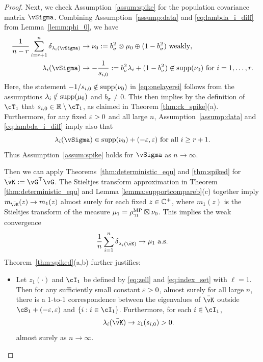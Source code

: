\begin{proof}
Next, we check Assumption~\ref{assum:spike} for the population
covariance matrix $\vSigma$.
Combining Assumption~\ref{assump:data} and \eqref{eq:lambda_i_diff} from
Lemma~\ref{lemm:phi_0}, we have
\begin{align}
\frac{1}{n-r}\sum_{i=r+1}^n \delta_{\lambda_i(\vSigma)}
&\to \nu_0:=b_\sigma^2 \otimes \mu_0 \oplus (1-b_\sigma^2) \text{ weakly},
\label{eq:onelayernu}\\
\lambda_i(\vSigma) &\to -\frac{1}{s_{i,0}}:=b_\sigma^2\lambda_i+(1-b_\sigma^2)
\not\in\supp{\nu_0} \text{ for } i=1,\ldots,r.
\label{eq:onelayersi}
\end{align}
Here, the statement $-1/s_{i,0} \notin \mathrm{supp}({\nu_0})$ in \eqref{eq:onelayersi}
follows from the assumptions
$\lambda_i \notin \mathrm{supp}({\mu_0})$ and $b_\sigma \neq 0$.
This then implies by the definition of $\cT_1$
that $s_{i,0} \in \R \setminus \cT_1$, as claimed in Theorem \ref{thm:ck_spike}(a).
Furthermore, for any fixed $\varepsilon>0$ and all large $n$,
Assumption~\ref{assump:data} and \eqref{eq:lambda_i_diff} imply also that
	\[\lambda_i(\vSigma) \in \supp{\nu_0}+(-\eps,\eps) \text{ for all }
	i \geq r+1.\]
Thus Assumption~\ref{assum:spike} holds for $\vSigma$ as $n \to \infty$.

Then we can apply Theorems~\ref{thm:deterministic_equ} and \ref{thm:spiked}
for $\bar\vK:=\vG^\top\vG$. The Stieltjes transform approximation in Theorem
\ref{thm:deterministic_equ} and Lemma \ref{lemma:supportcompareb}(c) together
imply $m_{\bar\vK}(z) \to m_1(z)$ almost surely for each fixed $z \in \mathbb{C}^+$,
where $m_1(z)$ is the Stieltjes transform of the measure
$\mu_1=\rho_{\gamma_1}^{\textnormal{MP}} \boxtimes \nu_0$. This implies the weak convergence
\begin{equation}\label{eq:Kbarweakconvergence}
\frac{1}{n}\sum_{i=1}^n \delta_{\lambda_i(\bar\vK)} \to \mu_1 \text{ a.s.}
\end{equation}
Theorem~\ref{thm:spiked}(a,b) further justifies:
	\begin{itemize}
\item Let $z_1(\cdot)$ and $\cI_1$ be defined by \eqref{eq:zell} and
\eqref{eq:index_set} with $\ell=1$. Then for any sufficiently small
constant $\varepsilon>0$, almost surely for all large $n$,
there is a 1-to-1 correspondence between the eigenvalues of $\bar\vK$ outside
$\cS_1+(-\eps,\eps)$ and $\{i:i \in \cI_1\}$. Furthermore,
for each $i \in \cI_1$,
\begin{equation}\label{eq:Kbareigval}
\lambda_i(\bar\vK) \to z_1(s_{i,0})>0.
\end{equation}
almost surely as $n \to \infty$.


\end{itemize}
\end{proof}
